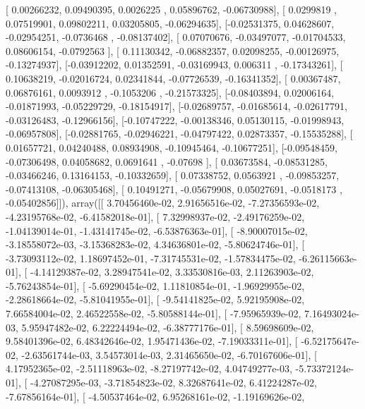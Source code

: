 \documentclass{article}
\begin{document}
       [ 0.00266232,  0.09490395,  0.0026225 ,  0.05896762, -0.06730988],
       [ 0.0299819 ,  0.07519901,  0.09802211,  0.03205805, -0.06294635],
       [-0.02531375,  0.04628607, -0.02954251, -0.0736468 , -0.08137402],
       [ 0.07070676, -0.03497077, -0.01704533,  0.08606154, -0.0792563 ],
       [ 0.11130342, -0.06882357,  0.02098255, -0.00126975, -0.13274937],
       [-0.03912202,  0.01352591, -0.03169943,  0.006311  , -0.17343261],
       [ 0.10638219, -0.02016724,  0.02341844, -0.07726539, -0.16341352],
       [ 0.00367487,  0.06876161,  0.0093912 , -0.1053206 , -0.21573325],
       [-0.08403894,  0.02006164, -0.01871993, -0.05229729, -0.18154917],
       [-0.02689757, -0.01685614, -0.02617791, -0.03126483, -0.12966156],
       [-0.10747222, -0.00138346,  0.05130115, -0.01998943, -0.06957808],
       [-0.02881765, -0.02946221, -0.04797422,  0.02873357, -0.15535288],
       [ 0.01657721,  0.04240488,  0.08934908, -0.10945464, -0.10677251],
       [-0.09548459, -0.07306498,  0.04058682,  0.0691641 , -0.07698   ],
       [ 0.03673584, -0.08531285, -0.03466246,  0.13164153, -0.10332659],
       [ 0.07338752,  0.0563921 , -0.09853257, -0.07413108, -0.06305468],
       [ 0.10491271, -0.05679908,  0.05027691, -0.0518173 , -0.05402856]]), array([[  3.70456460e-02,   2.91656516e-02,  -7.27356593e-02,
         -4.23195768e-02,  -6.41582018e-01],
       [  7.32998937e-02,  -2.49176259e-02,  -1.04139014e-01,
         -1.43141745e-02,  -6.53876363e-01],
       [ -8.90007015e-02,  -3.18558072e-03,  -3.15368283e-02,
          4.34636801e-02,  -5.80624746e-01],
       [ -3.73093112e-02,   1.18697452e-01,  -7.31745531e-02,
         -1.57834475e-02,  -6.26115663e-01],
       [ -4.14129387e-02,   3.28947541e-02,   3.33530816e-03,
          2.11263903e-02,  -5.76243854e-01],
       [ -5.69290454e-02,   1.11810854e-01,  -1.96929955e-02,
         -2.28618664e-02,  -5.81041955e-01],
       [ -9.54141825e-02,   5.92195908e-02,   7.66584004e-02,
          2.46522558e-02,  -5.80588144e-01],
       [ -7.95965939e-02,   7.16493024e-03,   5.95947482e-02,
          6.22224494e-02,  -6.38777176e-01],
       [  8.59698609e-02,   9.58401396e-02,   6.48342646e-02,
          1.95471436e-02,  -7.19033311e-01],
       [ -6.52175647e-02,  -2.63561744e-03,   3.54573014e-03,
          2.31465650e-02,  -6.70167606e-01],
       [  4.17952365e-02,  -2.51118963e-02,  -8.27197742e-02,
          4.04749277e-03,  -5.73372124e-01],
       [ -4.27087295e-03,  -3.71854823e-02,   8.32687641e-02,
          6.41224287e-02,  -7.67856164e-01],
       [ -4.50537464e-02,   6.95268161e-02,  -1.19169626e-02,
\end{document}
